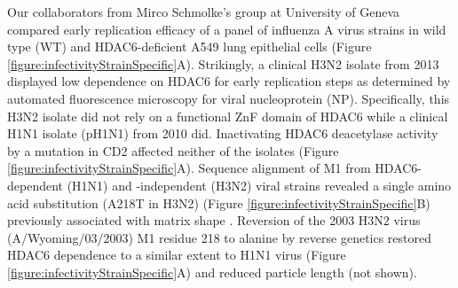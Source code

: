 Our collaborators from Mirco Schmolke's group at University of Geneva compared early replication efficacy of a panel of influenza A virus strains in wild type (WT) and HDAC6-deficient A549 lung epithelial cells (Figure \ref{figure:infectivityStrainSpecific}A). Strikingly, a clinical H3N2 isolate from 2013 displayed low dependence on HDAC6 for early replication steps as determined by automated fluorescence microscopy for viral nucleoprotein (NP). Specifically, this H3N2 isolate did not rely on a functional ZnF domain of HDAC6 while a clinical H1N1 isolate (pH1N1) from 2010 did. Inactivating HDAC6 deacetylase activity by a mutation in CD2 affected neither of the isolates (Figure \ref{figure:infectivityStrainSpecific}A). Sequence alignment of M1 from HDAC6-dependent (H1N1) and -independent (H3N2) viral strains revealed a single amino acid substitution (A218T in H3N2) (Figure \ref{figure:infectivityStrainSpecific}B) previously associated with matrix shape \cite{elleman2004m1}. Reversion of the 2003 H3N2 virus (A/Wyoming/03/2003) M1 residue 218 to alanine by reverse genetics restored HDAC6 dependence to a similar extent to H1N1 virus (Figure \ref{figure:infectivityStrainSpecific}A) and reduced particle length (not shown).


